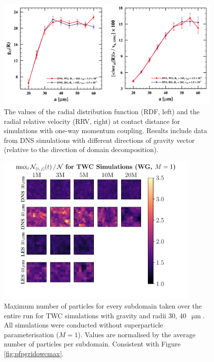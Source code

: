 
\begin{figure}
\centering
\includegraphics[width=13.5cm]{figures/3-22_howcrdfrrv.pdf}
\caption{
The values of the radial distribution function (RDF, left) and the radial relative velocity (RRV, right) at contact distance for simulations with one-way momentum coupling.
Results include data from DNS simulations with different directions of gravity vector (relative to the direction of domain decomposition).
}
\label{fig:howcrdfrrv}
\end{figure}
    

\begin{figure}
\centering
\includegraphics[width=10cm]{figures/3-23_pfpgridtwcmax.pdf}
\caption{
Maximum number of particles for every subdomain taken over the entire run for TWC simulations with gravity and radii $30$, $40$~$\upmu\text{m}$.
All simulations were conducted without superparticle parameterisation ($M=1$). 
Values are normalised by the average number of particles per subdomain.
Consistent with Figure \ref{fig:pfpgridowcmax}.
}
\label{fig:pfpgridtwcmax}
\end{figure}    

